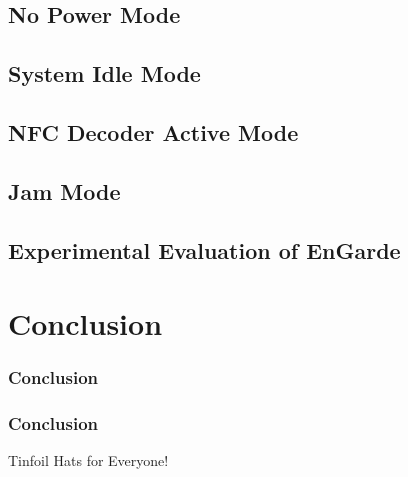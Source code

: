 \documentclass[unknownkeysallowed]{beamer}
\begin{document}
\subsection{No Power Mode}
\subsection{System Idle Mode}
\subsection{NFC Decoder Active Mode}
\subsection{Jam Mode}
\subsection{Experimental Evaluation of EnGarde}


\section{Conclusion}
\begin{frame}
\frametitle{Conclusion}
\begin{center}\begin{minipage}{.9\textwidth}
\tableofcontents[currentsubsection, hideothersubsections, sectionstyle=show/shaded]
\end{minipage}\end{center}
\end{frame}
%
\begin{frame}
  \frametitle{Conclusion}
  \begin{block}{Tinfoil Hats for Everyone!}
  \end{block}
\end{frame}
\end{document}
